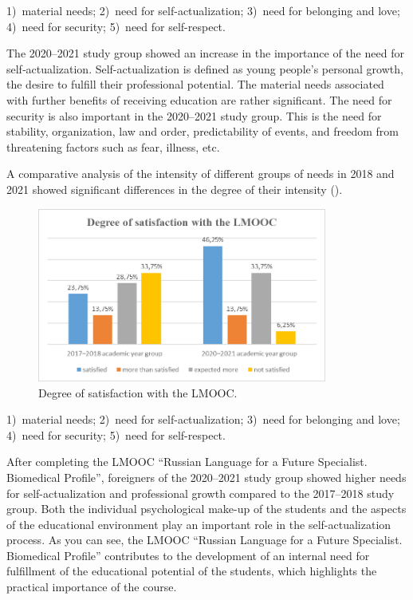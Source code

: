 \documentclass[english]{textolivre}
\begin{document}
1) material needs; 2) need for self-actualization; 3) need for belonging and love; 4) need for security; 5) need for self-respect.

The 2020–2021 study group showed an increase in the importance of the need for self‑actualization. Self-actualization is defined as young people’s personal growth, the desire to fulfill their professional potential. The material needs associated with further benefits of receiving education are rather significant. The need for security is also important in the 2020–2021 study group. This is the need for stability, organization, law and order, predictability of events, and freedom from threatening factors such as fear, illness, etc.

A comparative analysis of the intensity of different groups of needs in 2018 and 2021 showed significant differences in the degree of their intensity ().

\begin{figure}[htbp]
 \centering
 \includegraphics[width=0.85\textwidth]{Fig3.png}
 \caption{Degree of satisfaction with the LMOOC.}
 \label{fig03}
\end{figure}

1) material needs; 2) need for self-actualization; 3) need for belonging and love; 4) need for security; 5) need for self-respect.

After completing the LMOOC “Russian Language for a Future Specialist. Biomedical Profile”, foreigners of the 2020–2021 study group showed higher needs for self-actualization and professional growth compared to the 2017–2018 study group. Both the individual psychological make-up of the students and the aspects of the educational environment play an important role in the self-actualization process. As you can see, the LMOOC “Russian Language for a Future Specialist. Biomedical Profile” contributes to the development of an internal need for fulfillment of the educational potential of the students, which highlights the practical importance of the course.
\end{document}
